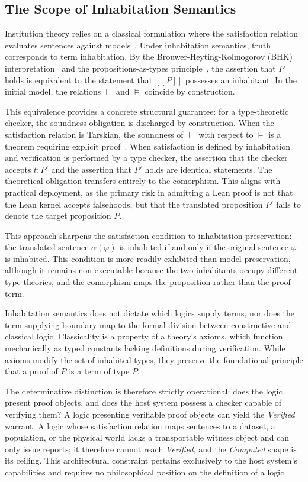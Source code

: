 \documentclass[manuscript,nonacm=true]{acmart}
\newcommand{\sem}[1]{[\![#1]\!]}
\begin{document}
\subsection{The Scope of Inhabitation Semantics}
\label{sec:inhabitation}

Institution theory relies on a classical formulation where the satisfaction relation evaluates sentences against models~\cite{gb92}. Under inhabitation semantics, truth corresponds to term inhabitation. By the Brouwer-Heyting-Kolmogorov (BHK) interpretation~\cite{tvd88} and the propositions-as-types principle~\cite{mltt}, the assertion that $P$ holds is equivalent to the statement that $\sem{P}$ possesses an inhabitant. In the initial model, the relations $\vdash$ and $\models$ coincide by construction.

This equivalence provides a concrete structural guarantee: for a type-theoretic checker, the soundness obligation is discharged by construction. When the satisfaction relation is Tarskian, the soundness of $\vdash$ with respect to $\models$ is a theorem requiring explicit proof~\cite{mes89}. When satisfaction is defined by inhabitation and verification is performed by a type checker, the assertion that the checker accepts $t : P'$ and the assertion that $P'$ holds are identical statements. The theoretical obligation transfers entirely to the comorphism. This aligns with practical deployment, as the primary risk in admitting a Lean proof is not that the Lean kernel accepts falsehoods, but that the translated proposition $P'$ fails to denote the target proposition $P$.

This approach sharpens the satisfaction condition to inhabitation-preservation: the translated sentence $\alpha(\varphi)$ is inhabited if and only if the original sentence $\varphi$ is inhabited. This condition is more readily exhibited than model-preservation, although it remains non-executable because the two inhabitants occupy different type theories, and the comorphism maps the proposition rather than the proof term.

Inhabitation semantics does not dictate which logics supply terms, nor does the term-supplying boundary map to the formal division between constructive and classical logic. Classicality is a property of a theory's axioms, which function mechanically as typed constants lacking definitions during verification. While axioms modify the set of inhabited types, they preserve the foundational principle that a proof of $P$ is a term of type $P$.

The determinative distinction is therefore strictly operational: does the logic present proof objects, and does the host system possess a checker capable of verifying them? A logic presenting verifiable proof objects can yield the \emph{Verified} warrant. A logic whose satisfaction relation maps sentences to a dataset, a population, or the physical world lacks a transportable witness object and can only issue reports; it therefore cannot reach \emph{Verified}, and the \emph{Computed} shape is its ceiling. This architectural constraint pertains exclusively to the host system's capabilities and requires no philosophical position on the definition of a logic.
\end{document}
